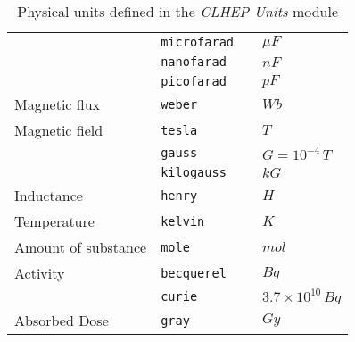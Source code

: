 \documentclass{article}
\begin{document}
\begin{table}
\begin{tabular}{|l|l|l|l|}
                   &{\tt microfarad}    &              &$ \mu F          $\\
                   &{\tt nanofarad}     &              &$ nF             $\\
                   &{\tt picofarad}     &              &$ pF             $\\
Magnetic flux      &{\tt weber}         &              &$ Wb             $\\
Magnetic field     &{\tt tesla}         &              &$ T              $\\
                   &{\tt gauss}         &              &$ G=10^{-4}\,T   $\\
                   &{\tt kilogauss}     &              &$ kG             $\\
Inductance         &{\tt henry}         &              &$ H              $\\
Temperature        &{\tt kelvin}        &              &$ K              $\\
Amount of substance&{\tt mole}          &              &$ mol            $\\
Activity           &{\tt becquerel}     &              &$ Bq             $\\
                   &{\tt curie}         & &$ 3.7\times10^{10}\,Bq        $\\
Absorbed Dose      &{\tt gray}          &              &$ Gy             $\\
\hline
\end {tabular}
\caption{Physical units defined in the {\it CLHEP Units} module}
\label{tab1}
\end{table}
\end{document}
